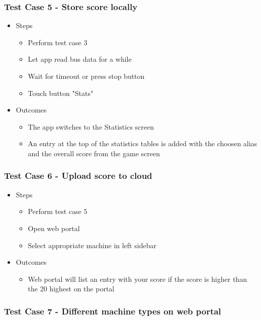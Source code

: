 \documentclass{article}
\begin{document}
\subsubsection*{Test Case 5 - Store score locally}

\begin{itemize}
\item Steps
\begin{itemize}
\item Perform test case 3
\item Let app read bus data for a while
\item Wait for timeout or press stop button
\item Touch button "Stats"
\end{itemize}
\item Outcomes
\begin{itemize}
\item The app switches to the Statistics screen
\item An entry at the top of the statistics tables is added with the choosen alias and the overall score from the game screen
\end{itemize}
\end{itemize}

\subsubsection*{Test Case 6 - Upload score to cloud}

\begin{itemize}
\item Steps
\begin{itemize}
\item Perform test case 5
\item Open web portal
\item Select appropriate machine in left sidebar
\end{itemize}
\item Outcomes
\begin{itemize}
\item Web portal will list an entry with your score if the score is higher than the 20 highest on the portal
\end{itemize}
\end{itemize}

\subsubsection*{Test Case 7 - Different machine types on web portal}
\end{document}
